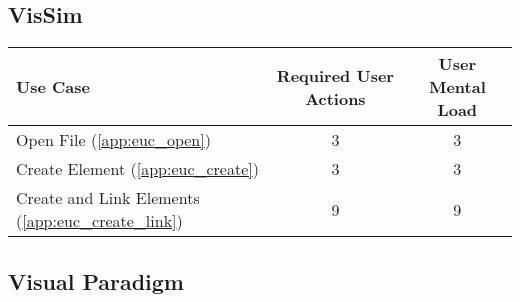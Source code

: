 \subsection*{VisSim}




\begin{tabularx}{\textwidth}{Xcc}
\textbf{Use Case} & \textbf{Required User Actions} & \textbf{User Mental Load}\\
\hline
Open File (\ref{app:euc_open})                       & 3 & 3 \\
Create Element (\ref{app:euc_create})                & 3 & 3 \\
Create and Link Elements (\ref{app:euc_create_link}) & 9 & 9
\end{tabularx}

\subsection*{Visual Paradigm}



